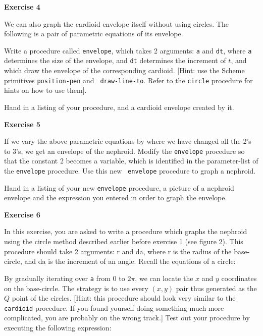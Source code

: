 {\bf Exercise 4}

We can also graph the cardioid envelope itself without using circles.  The
following is a pair of parametric equations of its envelope.


Write a procedure called {\tt envelope}, which takes 2 arguments: {\tt a}
and {\tt dt}, where {\tt a} determines the size of the envelope, and
{\tt dt} determines the increment of $t$, and which draw the envelope of
the corresponding cardioid.
[Hint: use the Scheme primitives {\tt position-pen}  and {\tt
draw-line-to}.  Refer to the {\tt circle} procedure for hints on how to use them]. 

Hand in a listing of your procedure, and a cardioid envelope created by it.

{\bf Exercise 5}

If we vary the above parametric equations by
where we have changed all the 2's to 3's, we get an envelope of the
nephroid.  Modify the {\tt envelope} procedure
so that the constant 2 becomes a variable, which is identified in the 
parameter-list of the {\tt envelope} procedure.  Use this new {\tt
envelope} procedure to graph a nephroid.

Hand in a listing of your new {\tt envelope} procedure, a picture of a
nephroid
envelope and the expression you entered in order to graph the
envelope. 

{\bf Exercise 6}

In this exercise, you are asked to write a procedure which graphs the nephroid
using the circle method described earlier before exercise 1 (see figure 2).  
This procedure should take 2 arguments: r and da, where r is the radius of the
base-circle, and da is the increment of an angle.  Recall the equations of a
circle:

By  gradually iterating over {\tt a} from 0 to $2\pi$, we can locate the $x$
and $y$ coordinates on the base-circle.  The strategy is to use every $(x,y)$ pair thus 
generated as the $Q$ point of the circles.  [Hint: this procedure should look
very similar to the {\tt cardioid} procedure.  If you found yourself
doing something
much more complicated, you are probably on the wrong track.]  Test out your
procedure by executing the following expression:

